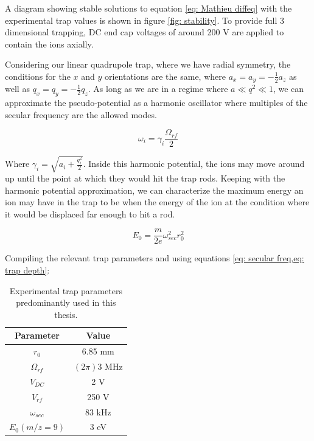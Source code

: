 A diagram showing stable solutions to equation \ref{eq: Mathieu diffeq} with the experimental trap values is shown in figure \ref{fig: stability}. To provide full 3 dimensional trapping, DC end cap voltages of around 200 V are applied to contain the ions axially.

Considering our linear quadrupole trap, where we have radial symmetry, the conditions for the $x$ and $y$ orientations are the same, where $a_x = a_y = -\frac{1}{2}a_z$ as well as $q_x = q_y = -\frac{1}{2}q_z$. As long as we are in a regime where $a \ll q^2 \ll 1$, we can approximate the pseudo-potential as a harmonic oscillator where multiples of the secular frequency are the allowed modes.

\begin{equation}
	\omega_i = \gamma_i \frac{\Omega_{rf}}{2}
	\label{eq: secular freq}
\end{equation}

Where $\gamma_i = \sqrt{a_i + \frac{q_i^2}{2}}$. Inside this harmonic potential, the ions may move around up until the point at which they would hit the trap rods. Keeping with the harmonic potential approximation, we can characterize the maximum energy an ion may have in the trap to be when the energy of the ion at the condition where it would be displaced far enough to hit a rod.

\begin{equation}
	E_0 = \frac{m}{2e} \omega_{sec}^2r_0^2
	\label{eq: trap depth}
\end{equation}

Compiling the relevant trap parameters and using equations \cref{eq: secular freq,eq: trap depth}:

\begin{table}[H]
	\centering
	\begin{tabular}{|c|c|}
		\hline
		Parameter & Value \\
		\hline
		$r_0$ & 6.85 mm \\
		$\Omega_{rf}$ & $(2 \pi) 3$ MHz \\
		$V_{DC}$ & 2 V \\
		$V_{rf}$ & 250 V \\
		$\omega_{sec}$ & 83 kHz \\
		$E_0(m/z=9)$ & 3 eV \\
		\hline
	\end{tabular}
	\caption{Experimental trap parameters predominantly used in this thesis.}
	\label{tab: trap params}
\end{table}


